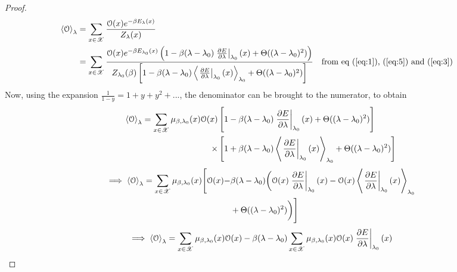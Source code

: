\documentclass[letterpaper,english,12pt]{article}
\begin{document}
\begin{proof}
\begin{align}
\left\langle \mathcal{O} \right\rangle_{\lambda} &= \sum_{x \in \mathscr{X}} \frac{\mathcal{O}(x) e^{-\beta E_\lambda(x)}}{Z_\lambda(x)} \nonumber \\
	&= \sum_{x \in \mathscr{X}} \frac{\mathcal{O}(x) e^{-\beta E_{\lambda_0}(x)}\left( 1 - \beta (\lambda - \lambda_0) \left. \frac{\partial E}{\partial \lambda} \right|_{\lambda_0}(x) + \Theta((\lambda - \lambda_0)^2) \right)}{Z_{\lambda_0}(\beta) \left[ 1 - \beta (\lambda - \lambda_0) \left\langle \left. \frac{\partial E}{\partial \lambda} \right|_{\lambda_0}(x) \right\rangle_{\lambda_0} + \Theta((\lambda - \lambda_0)^2) \right]} \nonumber &&\text{from eq (\ref{eq:1}), (\ref{eq:5}) and (\ref{eq:3})}
\end{align}
Now, using the expansion $\frac{1}{1-y} = 1 + y + y^2 + ...$, the denominator can be brought to the numerator, to obtain
\begin{equation}
\begin{aligned}
\left\langle \mathcal{O} \right\rangle_{\lambda} = \sum_{x \in \mathscr{X}} \mu_{\beta,\lambda_0}(x)\mathcal{O}(x)
	&\left[ 1 - \beta (\lambda - \lambda_0) \left. \frac{\partial E}{\partial \lambda} \right|_{\lambda_0}(x) + \Theta((\lambda - \lambda_0)^2) \right]\\
	\times &\left[ 1 + \beta (\lambda - \lambda_0) \left\langle \left. \frac{\partial E}{\partial \lambda} \right|_{\lambda_0}(x) \right\rangle_{\lambda_0} + \Theta((\lambda - \lambda_0)^2) \right]
\end{aligned} \nonumber
\end{equation}
\begin{equation}
\begin{aligned}
\implies \left\langle \mathcal{O} \right\rangle_{\lambda} = \sum_{x \in \mathscr{X}} \mu_{\beta,\lambda_0}(x)
	\Bigg[
	\mathcal{O}(x) - & \beta(\lambda - \lambda_0) \bigg( \mathcal{O}(x) \left. \frac{\partial E}{\partial \lambda} \right|_{\lambda_0}(x) - \mathcal{O}(x) \left\langle \left. \frac{\partial E}{\partial \lambda} \right|_{\lambda_0}(x) \right\rangle_{\lambda_0} \\
	& + \Theta((\lambda - \lambda_0)^2) \bigg)
	\Bigg]
\end{aligned}
\end{equation}
\begin{align}
\implies \left\langle \mathcal{O} \right\rangle_{\lambda} = \sum_{x \in \sX} \mu_{\beta,\lambda_0}(x) \mathcal{O}(x) & -
\beta (\lambda - \lambda_0)\sum_{x \in \sX} \mu_{\beta,\lambda_0}(x) \mathcal{O}(x) \left. \frac{\partial E}{\partial \lambda} \right|_{\lambda_0}(x) \nonumber \\

\end{align}
\end{proof}
\end{document}
